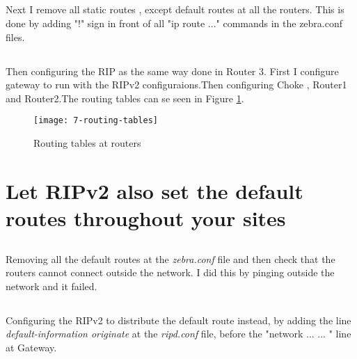 \documentclass{article}
\begin{document}
\subsection{}
Next I remove all static routes , except default routes at all the routers. 
This is done by adding "!" sign in front of all "ip route ..." commands in the zebra.conf files.

\subsection{}
Then configuring the RIP as the same way done in Router 3. First I configure gateway to run with the RIPv2 configuraions.Then configuring Choke , Router1 and Router2.The routing tables can se seen in Figure {\ref{fig:routing_tables}}.

\begin{figure}[!h]
    \texttt{[image: 7-routing-tables]}
    \label{fig:routing_tables}

    \caption{Routing tables at routers}
\end{figure}

\subsection{}

\subsection{}

\section{Let RIPv2 also set the default routes throughout your sites}

\subsection{}
Removing all the default routes at the \textit{zebra.conf} file and then check that the routers cannot connect outside the network. I did this by pinging outside the network and it failed.

\subsection{} 
Configuring the RIPv2 to distribute the default route instead, by adding the line \textit{default-information originate} at the \textit{ripd.conf} file, before the "network ... ... " line at Gateway.
\end{document}
